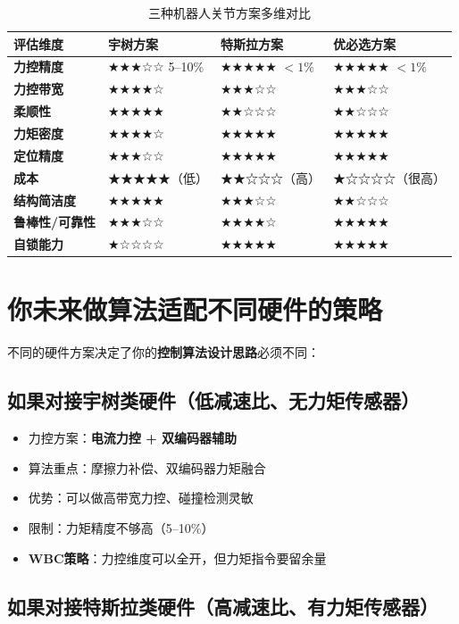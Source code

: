 \begin{table}[H]
\centering
\begin{tabular}{p{3cm}p{3.5cm}p{3.5cm}p{3.5cm}}
\toprule
\textbf{评估维度} & \textbf{宇树方案} & \textbf{特斯拉方案} & \textbf{优必选方案} \\
\midrule
\textbf{力控精度} & ★★★☆☆ 5--10\% & ★★★★★ $<1\%$ & ★★★★★ $<1\%$ \\
\textbf{力控带宽} & ★★★★☆ & ★★★☆☆ & ★★★☆☆ \\
\textbf{柔顺性} & ★★★★★ & ★★☆☆☆ & ★★☆☆☆ \\
\textbf{力矩密度} & ★★★★☆ & ★★★★★ & ★★★★★ \\
\textbf{定位精度} & ★★★☆☆ & ★★★★★ & ★★★★★ \\
\textbf{成本} & ★★★★★（低） & ★★☆☆☆（高） & ★☆☆☆☆（很高） \\
\textbf{结构简洁度} & ★★★★★ & ★★★☆☆ & ★★☆☆☆ \\
\textbf{鲁棒性/可靠性} & ★★★☆☆ & ★★★★☆ & ★★★★★ \\
\textbf{自锁能力} & ★☆☆☆☆ & ★★★★★ & ★★★★★ \\
\bottomrule
\end{tabular}
\caption{三种机器人关节方案多维对比}
\label{tab:multi_dim_compare}
\end{table}

\section{你未来做算法适配不同硬件的策略}

不同的硬件方案决定了你的\textbf{控制算法设计思路}必须不同：

\subsection{如果对接宇树类硬件（低减速比、无力矩传感器）}

\begin{itemize}
  \item 力控方案：\textbf{电流力控 + 双编码器辅助}
  \item 算法重点：摩擦力补偿、双编码器力矩融合
  \item 优势：可以做高带宽力控、碰撞检测灵敏
  \item 限制：力矩精度不够高（5--10\%）
  \item \textbf{WBC策略}：力控维度可以全开，但力矩指令要留余量
\end{itemize}

\subsection{如果对接特斯拉类硬件（高减速比、有力矩传感器）}

